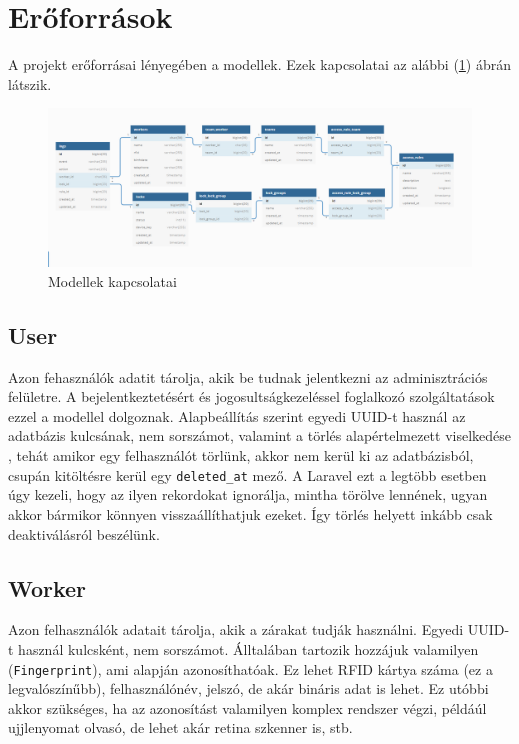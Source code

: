 \documentclass[a4paper,12pt]{thesis-ekf}
\theoremstyle{definition}
\begin{document}
		\section{Erőforrások}\label{sc-resources}
			A projekt erőforrásai lényegében a modellek. Ezek kapcsolatai az alábbi (\ref{fig-model-connections}) ábrán látszik.
			
			\begin{figure}[ht]
            	\centering
            	\includegraphics[width=1\textwidth]{images/model-connections.png}
            	\caption{Modellek kapcsolatai}
            	\label{fig-model-connections}
            \end{figure}
			
			\subsection{User}
				Azon fehasználók adatit tárolja, akik be tudnak jelentkezni az adminisztrációs felületre. A bejelentkeztetésért és jogosultságkezeléssel foglalkozó szolgáltatások ezzel a modellel dolgoznak. Alapbeállítás szerint egyedi UUID-t használ az adatbázis kulcsának, nem sorszámot, valamint a törlés alapértelmezett viselkedése , tehát amikor egy felhasználót törlünk, akkor nem kerül ki az adatbázisból, csupán kitöltésre kerül egy \texttt{deleted\_at} mező. A Laravel ezt a legtöbb esetben úgy kezeli, hogy az ilyen rekordokat ignorálja, mintha törölve lennének, ugyan akkor bármikor könnyen visszaállíthatjuk ezeket. Így törlés helyett inkább csak deaktiválásról beszélünk.
				
			\subsection{Worker}
				Azon felhasználók adatait tárolja, akik a zárakat tudják használni. Egyedi UUID-t használ kulcsként, nem sorszámot. Álltalában tartozik hozzájuk valamilyen  (\texttt{Fingerprint}), ami alapján azonosíthatóak. Ez lehet RFID kártya száma (ez a legvalószínűbb), felhasználónév, jelszó, de akár bináris adat is lehet. Ez utóbbi akkor szükséges, ha az azonosítást valamilyen komplex rendszer végzi, példáúl ujjlenyomat olvasó, de lehet akár retina szkenner is, stb.
				
\end{document}
